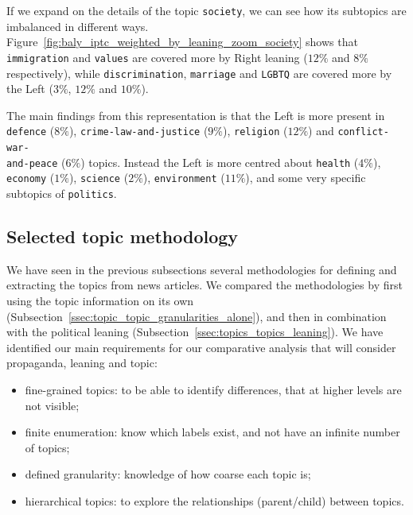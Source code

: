 If we expand on the details of the topic \texttt{society}, we can see how its subtopics are imbalanced in different ways. Figure~\ref{fig:baly_iptc_weighted_by_leaning_zoom_society} shows that \texttt{immigration} and \texttt{values} are covered more by Right leaning ($12\%$ and $8\%$ respectively), while \texttt{discrimination}, \texttt{marriage}
and \texttt{LGBTQ} are covered more by the Left ($3\%$, $12\%$ and $10\%$). 

The main findings from this representation is that the Left is more present in \texttt{defence} ($8\%$), \texttt{crime-law-and-justice} ($9\%$), \texttt{religion} ($12\%$) and \texttt{conflict-war-\\and-peace} ($6\%$) topics. Instead the Left is more centred about \texttt{health} ($4\%$), \texttt{economy} ($1\%$), \texttt{science} ($2\%$), \texttt{environment} ($11\%$), and some very specific subtopics of \texttt{politics}.


\subsection{\statusgreen Selected topic methodology}
\label{ssec:topic_topic_choice}

We have seen in the previous subsections several methodologies for defining and extracting the topics from news articles.
We compared the methodologies by first using the topic information on its own (Subsection~\ref{ssec:topic_topic_granularities_alone}), and then in combination with the political leaning (Subsection~\ref{ssec:topics_topics_leaning}).
We have identified our main requirements for our comparative analysis that will consider propaganda, leaning and topic:

\begin{itemize}
    \item fine-grained topics: to be able to identify differences, that at higher levels are not visible;
    \item finite enumeration: know which labels exist, and not have an infinite number of topics;
    \item defined granularity: knowledge of how coarse each topic is; %
    \item hierarchical topics: to explore the relationships (parent/child) between topics.
\end{itemize}

